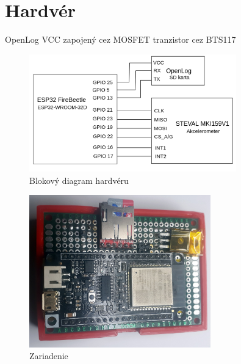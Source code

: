 \section{Hardvér}
OpenLog VCC zapojený cez MOSFET tranzistor cez BTS117
\begin{figure}[h]
	\centering
	\includegraphics[width=0.8\textwidth]{figures/design/block-circuit-diagram.png}
	\caption{Blokový diagram hardvéru}
\end{figure}

\begin{figure}[h]
	\centering
	\includegraphics[width=0.7\textwidth]{figures/design/esp32.jpg}
	\caption{Zariadenie}
\end{figure}

